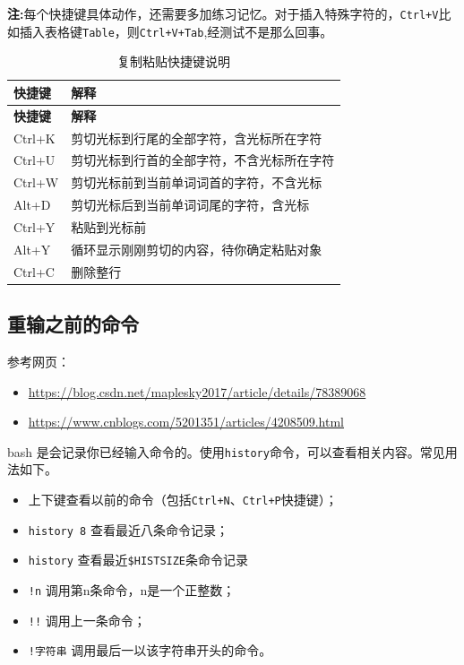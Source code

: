 \documentclass[doctor,openright,twoside]{sjtuthesis}
\providecommand{\tightlist}{%
    \setlength{\itemsep}{0pt}\setlength{\parskip}{0pt}}
\newcommand{\passthrough}[1]{#1}
\theoremstyle{plain}
\theoremstyle{definition}
\theoremstyle{remark}
\theoremstyle{ocrenumbox}
\theoremstyle{plain}
\begin{document}
\textbf{注:}每个快捷键具体动作，还需要多加练习记忆。对于插入特殊字符的，\passthrough{\lstinline!Ctrl+V!}比如插入表格键\passthrough{\lstinline!Table!}，则\passthrough{\lstinline!Ctrl+V+Tab!},经测试不是那么回事。

\begin{longtable}[]{@{}ll@{}}
\caption{复制粘贴快捷键说明\label{tab:cmd:xc-shortkey}}\tabularnewline
\toprule
\textbf{快捷键} & \textbf{解释}\tabularnewline
\midrule
\endfirsthead
\toprule
\textbf{快捷键} & \textbf{解释}\tabularnewline
\midrule
\endhead
Ctrl+K & 剪切光标到行尾的全部字符，含光标所在字符\tabularnewline
Ctrl+U & 剪切光标到行首的全部字符，不含光标所在字符\tabularnewline
Ctrl+W & 剪切光标前到当前单词词首的字符，不含光标\tabularnewline
Alt+D & 剪切光标后到当前单词词尾的字符，含光标\tabularnewline
Ctrl+Y & 粘贴到光标前\tabularnewline
Alt+Y & 循环显示刚刚剪切的内容，待你确定粘贴对象\tabularnewline
Ctrl+C & 删除整行\tabularnewline
\bottomrule
\end{longtable}

\subsection{重输之前的命令}

参考网页：

\begin{itemize}
\tightlist
\item
  \url{https://blog.csdn.net/maplesky2017/article/details/78389068}
\item
  \url{https://www.cnblogs.com/5201351/articles/4208509.html}
\end{itemize}

bash
是会记录你已经输入命令的。使用\passthrough{\lstinline!history!}命令，可以查看相关内容。常见用法如下。

\begin{itemize}
\tightlist
\item
  上下键查看以前的命令（包括\passthrough{\lstinline!Ctrl+N!}、\passthrough{\lstinline!Ctrl+P!}快捷键）；
\item
  \passthrough{\lstinline!history 8!} 查看最近八条命令记录；
\item
  \passthrough{\lstinline!history!}
  查看最近\passthrough{\lstinline!$HISTSIZE!}条命令记录
\item
  \passthrough{\lstinline"!n"} 调用第n条命令，n是一个正整数；
\item
  \passthrough{\lstinline"!!"} 调用上一条命令；
\item
  \passthrough{\lstinline"!字符串"} 调用最后一以该字符串开头的命令。
\end{itemize}
\end{document}
